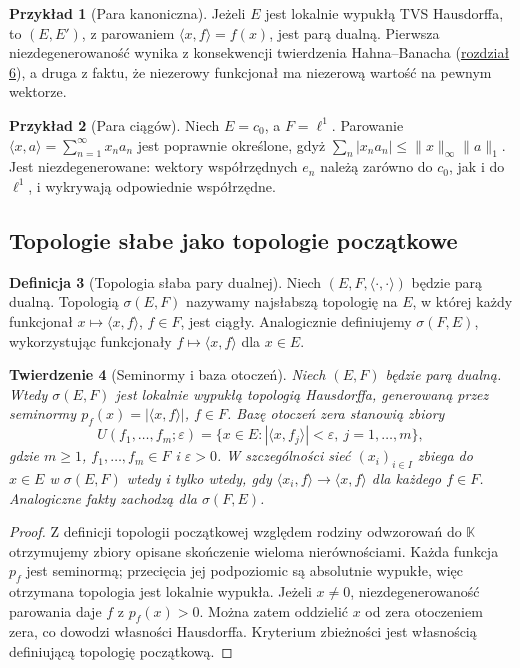 \documentclass[11pt,a4paper]{article}
\numberwithin{equation}{section}
\theoremstyle{plain}
\newtheorem{twierdzenie}{Twierdzenie}[section]
\theoremstyle{definition}
\newtheorem{definicja}[twierdzenie]{Definicja}
\newtheorem{przyklad}[twierdzenie]{Przykład}
\theoremstyle{remark}
\newcommand{\K}{\mathbb K}
\begin{document}
\begin{przyklad}[Para kanoniczna]
Jeżeli $E$ jest lokalnie wypukłą TVS Hausdorffa, to
$(E,E')$, z parowaniem $\langle x,f\rangle=f(x)$,
jest parą dualną. Pierwsza niezdegenerowaność wynika
z konsekwencji twierdzenia Hahna--Banacha (\hyperref[sec:hahn-banach]{rozdział 6}),
a druga z faktu, że niezerowy funkcjonał ma niezerową wartość
na pewnym wektorze.
\end{przyklad}

\begin{przyklad}[Para ciągów]
Niech $E=c_0$, a $F=\ell^1$. Parowanie
$\langle x,a\rangle=\sum_{n=1}^{\infty}x_na_n$
jest poprawnie określone, gdyż
$\sum_n|x_na_n|\le\|x\|_\infty\|a\|_1$.
Jest niezdegenerowane: wektory współrzędnych $e_n$ należą
zarówno do $c_0$, jak i do $\ell^1$, i wykrywają odpowiednie
współrzędne.
\end{przyklad}

\subsection{Topologie słabe jako topologie początkowe}

\begin{definicja}[Topologia słaba pary dualnej]\label{def:slaba-para}
Niech $(E,F,\langle\cdot,\cdot\rangle)$ będzie parą dualną.
Topologią $\sigma(E,F)$ nazywamy najsłabszą topologię na $E$,
w której każdy funkcjonał $x\mapsto\langle x,f\rangle$,
$f\in F$, jest ciągły. Analogicznie definiujemy
$\sigma(F,E)$, wykorzystując funkcjonały
$f\mapsto\langle x,f\rangle$ dla $x\in E$.
\end{definicja}

\begin{twierdzenie}[Seminormy i baza otoczeń]\label{thm:slaba-baza}
Niech $(E,F)$ będzie parą dualną. Wtedy $\sigma(E,F)$
jest lokalnie wypukłą topologią Hausdorffa, generowaną przez
seminormy $p_f(x)=|\langle x,f\rangle|$, $f\in F$.
Bazę otoczeń zera stanowią zbiory
\[
 U(f_1,\ldots,f_m;\varepsilon)
 =\{x\in E:|\langle x,f_j\rangle|<\varepsilon,
 \ j=1,\ldots,m\},
\]
gdzie $m\ge1$, $f_1,\ldots,f_m\in F$ i $\varepsilon>0$.
W szczególności sieć $(x_i)_{i\in I}$ zbiega do $x\in E$
w $\sigma(E,F)$ wtedy i tylko wtedy, gdy
$\langle x_i,f\rangle\to\langle x,f\rangle$ dla każdego $f\in F$.
Analogiczne fakty zachodzą dla $\sigma(F,E)$.
\end{twierdzenie}
\begin{proof}
Z definicji topologii początkowej względem rodziny
odwzorowań do $\K$ otrzymujemy zbiory opisane skończenie
wieloma nierównościami. Każda funkcja $p_f$ jest seminormą;
przecięcia jej podpoziomic są absolutnie wypukłe, więc
otrzymana topologia jest lokalnie wypukła. Jeżeli $x\ne0$,
niezdegenerowaność parowania daje $f$ z $p_f(x)>0$.
Można zatem oddzielić $x$ od zera otoczeniem zera,
co dowodzi własności Hausdorffa. Kryterium zbieżności
jest własnością definiującą topologię początkową.
\end{proof}
\end{document}

